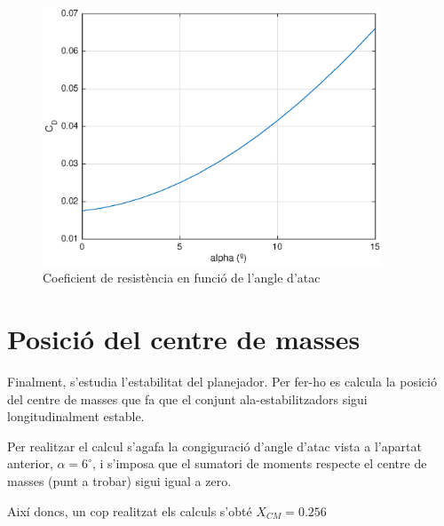 \begin{figure}[h]
	\centering
	\includegraphics[width=0.9\textwidth]{./plots/CDvsalpha_4}
	\caption{Coeficient de resistència en funció de l'angle d'atac}
	\label{CDvsalpha}
\end{figure}


 
\section{Posició del centre de masses} 

Finalment, s'estudia l'estabilitat del planejador. Per fer-ho es calcula la posició del centre de masses que fa que el conjunt ala-estabilitzadors sigui longitudinalment estable. 

Per realitzar el calcul s'agafa la congiguració d'angle d'atac vista a l'apartat anterior, $\alpha=6^{\circ}$, i s'imposa que el sumatori de moments respecte el centre de masses (punt a trobar) sigui igual a zero. 

Així doncs, un cop realitzat els calculs s'obté $X_{CM} = 0.256 $ 